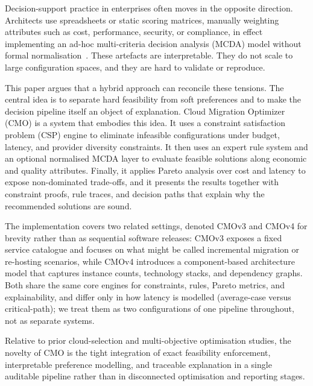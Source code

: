 \documentclass[journal]{IEEEtran}
\newcommand{\cmo}{CMO\xspace}
\newcommand{\cmothree}{CMOv3\xspace}
\newcommand{\cmofour}{CMOv4\xspace}
\begin{document}
Decision-support practice in enterprises often moves in the opposite direction.
Architects use spreadsheets or static scoring matrices, manually weighting
attributes such as cost, performance, security, or compliance, in effect
implementing an ad-hoc multi-criteria decision analysis (MCDA) model without
formal normalisation~\cite{hwang_madm,saaty_ahp}. These artefacts are
interpretable. They do not scale to large configuration spaces, and they are
hard to validate or reproduce.

This paper argues that a hybrid approach can reconcile these tensions. The
central idea is to separate hard feasibility from soft preferences and to make
the decision pipeline itself an object of explanation. Cloud Migration Optimizer
(\cmo) is a system that embodies this idea. It uses a constraint satisfaction
problem (CSP) engine to eliminate infeasible configurations under budget,
latency, and provider diversity constraints. It then uses an expert rule system
and an optional normalised MCDA layer to evaluate feasible solutions along
economic and quality attributes. Finally, it applies Pareto analysis over cost
and latency to expose non-dominated trade-offs, and it presents the results
together with constraint proofs, rule traces, and decision paths that explain
why the recommended solutions are sound.

The implementation covers two related settings, denoted \cmothree and
\cmofour for brevity rather than as sequential software releases: \cmothree
exposes a fixed service catalogue and focuses on what might be called
incremental migration or re-hosting scenarios, while \cmofour introduces a
component-based architecture model that captures instance counts, technology
stacks, and dependency graphs. Both share the same core engines for
constraints, rules, Pareto metrics, and explainability, and differ only in
how latency is modelled (average-case versus critical-path); we treat them
as two configurations of one pipeline throughout, not as separate systems.

Relative to prior cloud-selection and multi-objective optimisation studies, the
novelty of \cmo is the tight integration of exact feasibility enforcement,
interpretable preference modelling, and traceable explanation in a single
auditable pipeline rather than in disconnected optimisation and reporting stages.
\end{document}
